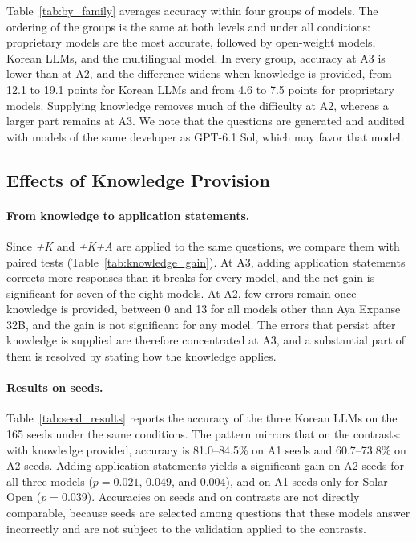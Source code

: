 Table~\ref{tab:by_family} averages accuracy within four groups of models.
The ordering of the groups is the same at both levels and under all conditions: proprietary models are the most accurate, followed by open-weight models, Korean LLMs, and the multilingual model.
In every group, accuracy at A3 is lower than at A2, and the difference widens when knowledge is provided, from 12.1 to 19.1 points for Korean LLMs and from 4.6 to 7.5 points for proprietary models.
Supplying knowledge removes much of the difficulty at A2, whereas a larger part remains at A3.
We note that the questions are generated and audited with models of the same developer as GPT-6.1 Sol, which may favor that model.



\subsection{Effects of Knowledge Provision}

\paragraph{From knowledge to application statements.}
Since \textit{+K} and \textit{+K+A} are applied to the same questions, we compare them with paired tests (Table~\ref{tab:knowledge_gain}).
At A3, adding application statements corrects more responses than it breaks for every model, and the net gain is significant for seven of the eight models.
At A2, few errors remain once knowledge is provided, between 0 and 13 for all models other than Aya Expanse 32B, and the gain is not significant for any model.
The errors that persist after knowledge is supplied are therefore concentrated at A3, and a substantial part of them is resolved by stating how the knowledge applies.



\paragraph{Results on seeds.}
Table~\ref{tab:seed_results} reports the accuracy of the three Korean LLMs on the 165 seeds under the same conditions.
The pattern mirrors that on the contrasts: with knowledge provided, accuracy is 81.0--84.5\% on A1 seeds and 60.7--73.8\% on A2 seeds.
Adding application statements yields a significant gain on A2 seeds for all three models ($p = 0.021$, $0.049$, and $0.004$), and on A1 seeds only for Solar Open ($p = 0.039$).
Accuracies on seeds and on contrasts are not directly comparable, because seeds are selected among questions that these models answer incorrectly and are not subject to the validation applied to the contrasts.

